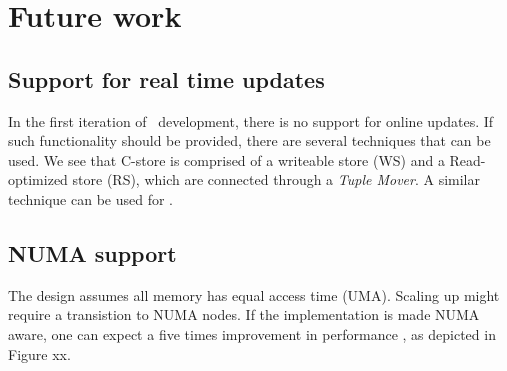\section{Future work}
\label{sec:Future work}
\subsection{Support for real time updates}
\label{sub:Support for real time updates}
In the first iteration of \projectName~development, there is no support for online updates. If such functionality should be provided, there are several techniques that can be used. We see that C-store \cite{Stonebraker2005-qz} is comprised of a writeable store (WS) and a Read-optimized store (RS), which are connected through a \textit{Tuple Mover}. A similar technique can be used for \projectName .

\subsection{NUMA support}
\label{sub:NUMA support}
The design assumes all memory has equal access time (UMA). Scaling up might require a transistion to NUMA nodes. If the implementation is made NUMA aware, one can expect a five times improvement in performance \cite{Psaroudakis2015-lc}, as depicted in Figure xx.
